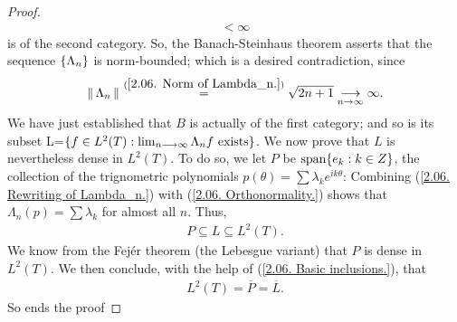 \begin{proof}
\begin{align}
{{      } < \infty
  } %
  \end{align}
%
is of the second category. %
So, the Banach-Steinhaus theorem  asserts that the sequence %
%
  $\{\Lambda_n\}$ %
%
is norm-bounded; which is a desired contradiction, since %
%
  \begin{align}
    \norm{}{\Lambda_n} \citeq{
      \ref{2.06. Norm of Lambda_n.}
    } \sqrt{2n + 1} \tendsto{n}{\infty}\infty.
%
  \end{align}
%
We have just established that $B$ is actually of the first category; %
and so is its subset %
%
  L=$\{f\in {L}^2(T): \lim_{n\longrightarrow\infty}\Lambda_n f \text{ exists}\}$. %
We now prove that $L$ is nevertheless dense in $L^2(T)$. %
To do so, we let $P$ be $\text{span}\{e_k: k\in Z\} $, %
the collection of the trignometric polynomials %
%
  $p(\theta)= \sum \lambda_k e^{ik\theta}$: %
%
Combining %
%
  (\ref{2.06. Rewriting of Lambda_n.}) with %
  (\ref{2.06. Orthonormality.}) %
%
shows that %
$\Lambda_n(p)= \sum \lambda_k$ for almost all $n$. %
Thus, 
%
  \begin{align}\label{2.06. Basic inclusions.}
    P \subseteq L \subseteq L^2(T).
  \end{align}
%
We know from the Fejér theorem (the Lebesgue variant) that %
$P$ is dense in $L^2(T)$. We then conclude, with the help of %
%
  (\ref{2.06. Basic inclusions.}), %
%
that %
%
  \begin{align}
    L^2(T) = \overline{P} = \overline{L}.
  \end{align}
%
So ends the proof
\end{proof}



